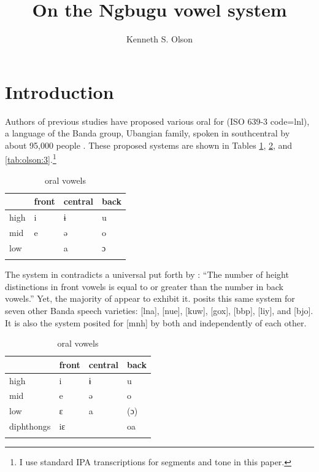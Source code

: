 \documentclass[output=paper,colorlinks,citecolor=brown]{langscibook}
\title{On the Ngbugu vowel system}
\author{Kenneth S. Olson\affiliation{SIL International}
}
\begin{document}
\maketitle

\section{Introduction}\label{sec:olson:1}

Authors of previous studies have proposed various oral  for  (ISO 639-3 code=lnl), a language of the Banda  group, Ubangian  family, spoken in southcentral  by about 95,000 people \citep{SimonsFennig2018}. These proposed systems are shown in Tables \ref{tab:olson:1}, \ref{tab:olson:2}, and \ref{tab:olson:3}.\footnote{I use standard IPA transcriptions for segments and tone in this paper.}

\begin{table}
\caption{ oral vowels \citep[13--14]{Cloarec-Heiss1978}}
\label{tab:olson:1}
    \begin{tabularx}{.8\textwidth}{XXXX}
    \lsptoprule
                & front & central & back\\
    \midrule
        high    & i     & ɨ       & u\\
        mid     & e     & ə       & o\\
        low     &       & a       & ɔ\\
    \lspbottomrule
    \end{tabularx}
\end{table}

The system in  contradicts a universal  put forth by \citet[122]{Crothers1978}: “The number of height  distinctions in front vowels is equal to or greater than the number in back vowels.” Yet, the majority of  appear to exhibit it. \citet[13--16]{Cloarec-Heiss1978} posits this same system for seven other Banda  speech varieties:  [lna],  [nue],  [kuw],  [gox],  [bbp],  [liy], and  [bjo]. It is also the system posited for  [mnh] by both \citet{Kamanda-Kola2003} and \citet{Olson2005} independently of each other.

\begin{table}
\caption{ oral vowels \citep[43]{Théret-Kieschke1998}}
\label{tab:olson:2}
    \begin{tabularx}{.8\textwidth}{XXXX}
    \lsptoprule
                    & front & central & back\\
    \midrule
        high        & i     & ɨ       & u\\
        mid         & e     & ə       & o\\
        low         & ɛ     & a       & (ɔ)\\
        diphthongs  & iɛ    &         & oa\\
    \lspbottomrule
    \end{tabularx}
\end{table}
\end{document}

